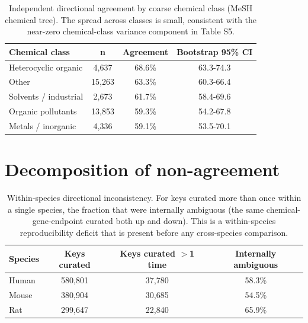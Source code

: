 \documentclass[11pt]{elsarticle}
\begin{document}
\begin{table}[H]
\small
\centering
\caption{Independent directional agreement by coarse chemical class (MeSH
chemical tree). The spread across classes is small, consistent with the
near-zero chemical-class variance component in Table S5.}
\label{tab:s3}
\begin{tabular}{lccc}
\toprule
Chemical class & n & Agreement & Bootstrap 95\% CI \\
\midrule
Heterocyclic organic & 4{,}637 & 68.6\% & 63.3-74.3 \\
Other & 15{,}263 & 63.3\% & 60.3-66.4 \\
Solvents / industrial & 2{,}673 & 61.7\% & 58.4-69.6 \\
Organic pollutants & 13{,}853 & 59.3\% & 54.2-67.8 \\
Metals / inorganic & 4{,}336 & 59.1\% & 53.5-70.1 \\
\bottomrule
\end{tabular}
\end{table}

\clearpage
\section{Decomposition of non-agreement}

\begin{table}[H]
\small
\centering
\caption{Within-species directional inconsistency. For keys curated more than
once within a single species, the fraction that were internally ambiguous (the
same chemical-gene-endpoint curated both up and down). This is a within-species
reproducibility deficit that is present before any cross-species comparison.}
\label{tab:s4}
\begin{tabular}{lccc}
\toprule
Species & Keys curated & Keys curated $>$1 time & Internally ambiguous \\
\midrule
Human & 580{,}801 & 37{,}780 & 58.3\% \\
Mouse & 380{,}904 & 30{,}685 & 54.5\% \\
Rat & 299{,}647 & 22{,}840 & 65.9\% \\
\bottomrule
\end{tabular}
\end{table}
\end{document}
